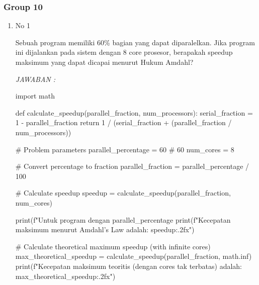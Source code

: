 \documentclass[12pt]{article}
\begin{document}
\subsubsection{Group 10}
\begin{enumerate}
    \item No 1

    Sebuah program memiliki 60\% bagian yang dapat diparalelkan. Jika program ini dijalankan pada sistem dengan 8 core prosesor, berapakah speedup maksimum yang dapat dicapai menurut Hukum Amdahl?

\textit{JAWABAN : }
\begin{python}
import math

def calculate_speedup(parallel_fraction, num_processors):
    serial_fraction = 1 - parallel_fraction
    return 1 / (serial_fraction + (parallel_fraction / num_processors))

# Problem parameters
parallel_percentage = 60  # 60%
num_cores = 8

# Convert percentage to fraction
parallel_fraction = parallel_percentage / 100

# Calculate speedup
speedup = calculate_speedup(parallel_fraction, num_cores)

print(f"Untuk program dengan {parallel_percentage}%
print(f"Kecepatan maksimum menurut Amdahl's Law adalah: {speedup:.2f}x")

# Calculate theoretical maximum speedup (with infinite cores)
max_theoretical_speedup = calculate_speedup(parallel_fraction, math.inf)
print(f"Kecepatan maksimum teoritis (dengan cores tak terbatas) adalah: {max_theoretical_speedup:.2f}x")
\end{python}


\end{enumerate}
\end{document}
